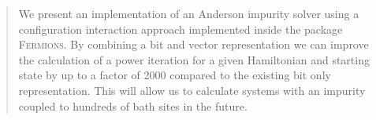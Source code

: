 \begin{abstract}
    We present an implementation of an Anderson impurity solver using a
    configuration interaction approach implemented inside the package
    \textsc{Fermions}.
    By combining a bit and vector representation we can improve the calculation
    of a power iteration for a given Hamiltonian and starting state by up to
    a factor of \num{2000} compared to the existing bit only representation.
    This will allow us to calculate systems with an impurity coupled to
    hundreds of bath sites in the future.
\end{abstract}
